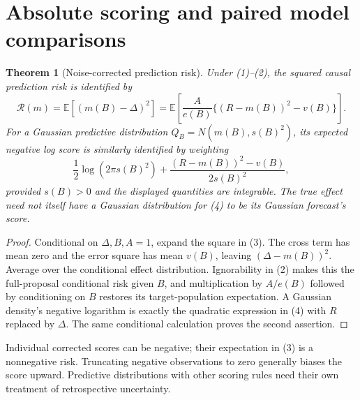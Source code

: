 \documentclass[11pt,a4paper]{article}
\newtheorem{theorem}{Theorem}[section]
\theoremstyle{remark}
\newcommand{\E}{\mathbb E}
\begin{document}
\section{Absolute scoring and paired model comparisons}
\begin{theorem}[Noise-corrected prediction risk]
Under (1)--(2), the squared causal prediction risk is identified by
\[
 \mathcal R(m)=\E[(m(B)-\Delta)^2]
 =\E\left[\frac A{e(B)}\{(R-m(B))^2-v(B)\}\right]. \tag{3}
\]
For a Gaussian predictive distribution $Q_B=N(m(B),s(B)^2)$, its expected negative log score is similarly identified by weighting
\[
 \frac12\log(2\pi s(B)^2)
 +\frac{(R-m(B))^2-v(B)}{2s(B)^2}, \tag{4}
\]
provided $s(B)>0$ and the displayed quantities are integrable. The true effect need not itself have a Gaussian distribution for (4) to be its Gaussian forecast's score.
\end{theorem}
\begin{proof}
Conditional on $\Delta,B,A=1$, expand the square in (3). The cross term has mean zero and the error square has mean $v(B)$, leaving $(\Delta-m(B))^2$. Average over the conditional effect distribution. Ignorability in (2) makes this the full-proposal conditional risk given $B$, and multiplication by $A/e(B)$ followed by conditioning on $B$ restores its target-population expectation. A Gaussian density's negative logarithm is exactly the quadratic expression in (4) with $R$ replaced by $\Delta$. The same conditional calculation proves the second assertion.
\end{proof}
Individual corrected scores can be negative; their expectation in (3) is a nonnegative risk. Truncating negative observations to zero generally biases the score upward. Predictive distributions with other scoring rules need their own treatment of retrospective uncertainty.
\end{document}
